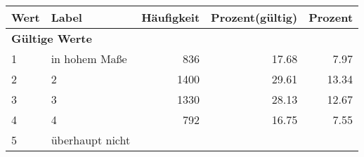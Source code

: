      \begin{longtable}{lXrrr}
     \toprule
     \textbf{Wert} & \textbf{Label} & \textbf{Häufigkeit} & \textbf{Prozent(gültig)} & \textbf{Prozent} \\
     \endhead
     \midrule
     \multicolumn{5}{l}{\textbf{Gültige Werte}}\\

     1 &
     \multicolumn{1}{X}{ in hohem Maße   } &


       \num{836} &
       \num[round-mode=places,round-precision=2]{17,68} &
         \num[round-mode=places,round-precision=2]{7,97} \\

     2 &
     \multicolumn{1}{X}{ 2   } &


       \num{1400} &
       \num[round-mode=places,round-precision=2]{29,61} &
         \num[round-mode=places,round-precision=2]{13,34} \\

     3 &
     \multicolumn{1}{X}{ 3   } &


       \num{1330} &
       \num[round-mode=places,round-precision=2]{28,13} &
         \num[round-mode=places,round-precision=2]{12,67} \\

     4 &
     \multicolumn{1}{X}{ 4   } &


       \num{792} &
       \num[round-mode=places,round-precision=2]{16,75} &
         \num[round-mode=places,round-precision=2]{7,55} \\

     5 &
     \multicolumn{1}{X}{ überhaupt nicht   } &



\end{longtable}

